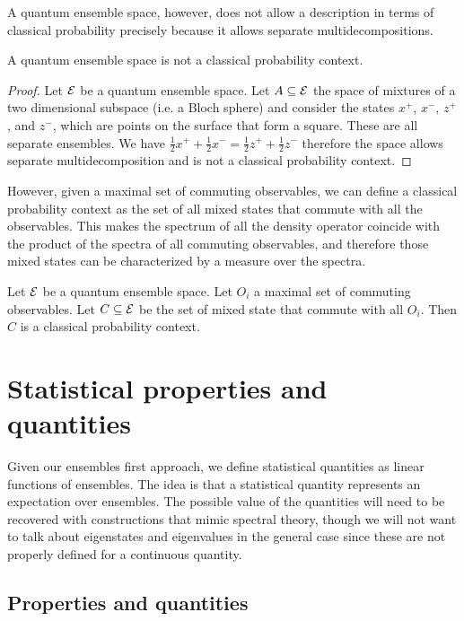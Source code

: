 A quantum ensemble space, however, does not allow a description in terms of classical probability precisely because it allows separate multidecompositions.

\begin{prop}
	A quantum ensemble space is not a classical probability context.
\end{prop}

\begin{proof}
Let $\mathcal{E}$ be a quantum ensemble space. Let $A \subseteq \mathcal{E}$ the space of mixtures of a two dimensional subspace (i.e. a Bloch sphere) and consider the states $x^+$, $x^-$, $z^+$, and $z^-$, which are points on the surface that form a square. These are all separate ensembles. We have $\frac{1}{2} x^+ + \frac{1}{2} x^- = \frac{1}{2} z^+ + \frac{1}{2} z^-$ therefore the space allows separate multidecomposition and is not a classical probability context.
\end{proof}

However, given a maximal set of commuting observables, we can define a classical probability context as the set of all mixed states that commute with all the observables. This makes the spectrum of all the density operator coincide with the product of the spectra of all commuting observables, and therefore those mixed states can be characterized by a measure over the spectra.

\begin{conj}
	Let $\mathcal{E}$ be a quantum ensemble space. Let $O_i$ a maximal set of commuting observables. Let $C \subseteq \mathcal{E}$ be the set of mixed state that commute with all $O_i$. Then $C$ is a classical probability context.
\end{conj}

\section{Statistical properties and quantities}

Given our ensembles first approach, we define statistical quantities as linear functions of ensembles. The idea is that a statistical quantity represents an expectation over ensembles. The possible value of the quantities will need to be recovered with constructions that mimic spectral theory, though we will not want to talk about eigenstates and eigenvalues in the general case since these are not properly defined for a continuous quantity.

\subsection{Properties and quantities}

